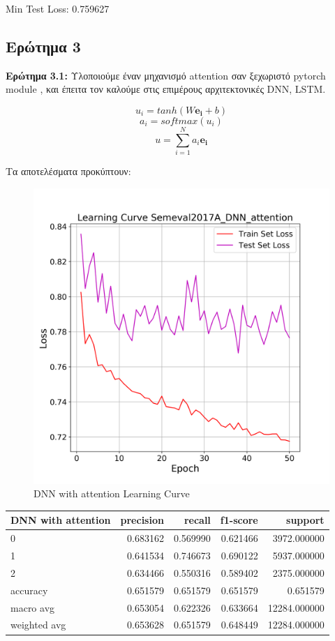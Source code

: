 \documentclass[12pt]{article}
\begin{document}
Min Test Loss: 0.759627




\subsection{Ερώτημα 3}
\textbf{Ερώτημα 3.1:}
Υλοποιούμε έναν μηχανισμό attention σαν ξεχωριστό pytorch module , και έπειτα τον καλούμε στις επιμέρους αρχιτεκτονικές DNN, LSTM.

$$u_i = tanh(W\mathbf{e_i}+b)$$
$$a_i = softmax(u_i)$$
$$u = \sum_{i=1}^N a_i\mathbf{e_i}$$

Τα αποτελέσματα προκύπτουν:


\begin{figure}[h!]
	\centering
	\includegraphics[width=0.6\linewidth]{./img/Semeval2017A/DNN_attention_loss}
	\caption{DNN with attention Learning Curve}
	\label{fig:sin}
\end{figure}


\begin{tabular}{lrrrr}
\toprule
DNN with attention &  precision &    recall &  f1-score &       support \\
\midrule
0            &   0.683162 &  0.569990 &  0.621466 &   3972.000000 \\
1            &   0.641534 &  0.746673 &  0.690122 &   5937.000000 \\
2            &   0.634466 &  0.550316 &  0.589402 &   2375.000000 \\
accuracy     &   0.651579 &  0.651579 &  0.651579 &      0.651579 \\
macro avg    &   0.653054 &  0.622326 &  0.633664 &  12284.000000 \\
weighted avg &   0.653628 &  0.651579 &  0.648449 &  12284.000000 \\
\bottomrule
\end{tabular}
\end{document}

